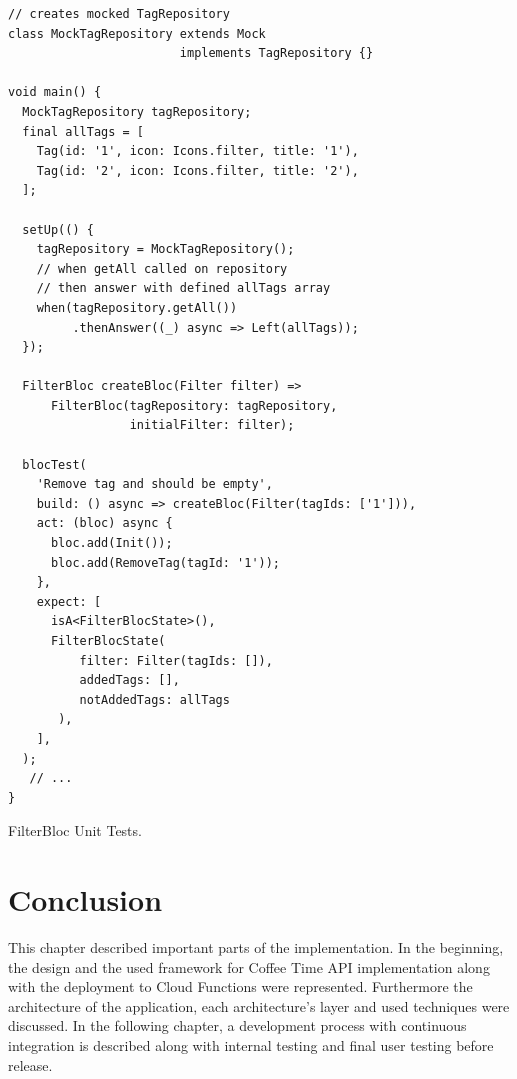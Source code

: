 \begin{listing}[ht]
\begin{verbatim}
// creates mocked TagRepository
class MockTagRepository extends Mock 
                        implements TagRepository {}

void main() {
  MockTagRepository tagRepository;
  final allTags = [
    Tag(id: '1', icon: Icons.filter, title: '1'),
    Tag(id: '2', icon: Icons.filter, title: '2'),
  ];

  setUp(() {
    tagRepository = MockTagRepository();
    // when getAll called on repository
    // then answer with defined allTags array
    when(tagRepository.getAll())
         .thenAnswer((_) async => Left(allTags));
  });

  FilterBloc createBloc(Filter filter) =>
      FilterBloc(tagRepository: tagRepository, 
                 initialFilter: filter);
  
  blocTest(
    'Remove tag and should be empty',
    build: () async => createBloc(Filter(tagIds: ['1'])),
    act: (bloc) async {
      bloc.add(Init());
      bloc.add(RemoveTag(tagId: '1'));
    },
    expect: [
      isA<FilterBlocState>(),
      FilterBlocState(
          filter: Filter(tagIds: []), 
          addedTags: [], 
          notAddedTags: allTags
       ),
    ],
  );
   // ...
}
\end{verbatim}
\caption{FilterBloc Unit Tests.}
\label{listing:ct-filter-bloc-unit-tests}
\end{listing}

\section{Conclusion}
This chapter described important parts of the implementation. In the beginning, the design and the used framework for Coffee Time API implementation along with the deployment to Cloud Functions were represented. Furthermore the architecture of the application, each architecture's layer and used techniques were discussed. In the following chapter, a development process with continuous integration is described along with internal testing and final user testing before release.
